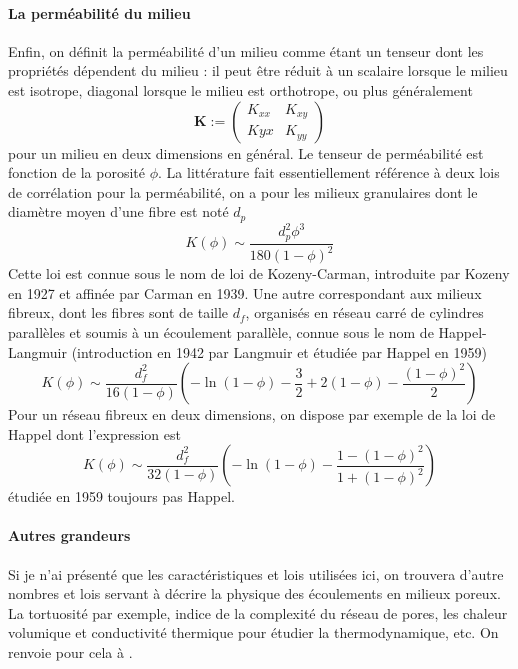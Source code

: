 \paragraph{La perméabilité du milieu} Enfin, on définit la perméabilité d'un milieu comme étant un tenseur dont les propriétés dépendent du milieu : il peut être réduit à un scalaire lorsque le milieu est isotrope, diagonal lorsque le milieu est orthotrope, ou plus généralement $$ \mathbf{K} := \begin{pmatrix} K_{xx} & K_{xy} \\ K{yx} & K_{yy} \end{pmatrix} $$ pour un milieu en deux dimensions en général. Le tenseur de perméabilité est fonction de la porosité $\phi$. La littérature fait essentiellement référence à deux lois de corrélation pour la perméabilité, on a pour les milieux granulaires dont le diamètre moyen d'une fibre est noté $d_p$
\begin{equation*} \tag{KC}
    K(\phi) \sim \frac{d_p^2 \phi^3}{180(1-\phi)^2} 
\end{equation*}
Cette loi est connue sous le nom de loi de Kozeny-Carman, introduite par Kozeny en 1927 et affinée par Carman en 1939. Une autre correspondant aux milieux fibreux, dont les fibres sont de taille $d_f$, organisés en réseau carré de cylindres parallèles et soumis à un écoulement parallèle, connue sous le nom de Happel-Langmuir (introduction en 1942 par Langmuir et étudiée par Happel en 1959)
\begin{equation*} \tag{HL}
    K(\phi) \sim \frac{d_f^2}{16(1-\phi)} \left( -\ln(1-\phi) - \frac{3}{2} + 2(1-\phi) - \frac{(1-\phi)^2}{2} \right)
\end{equation*}
Pour un réseau fibreux en deux dimensions, on dispose par exemple de la loi de Happel dont l'expression est
\begin{equation*} \tag{HL}
    K(\phi) \sim \frac{d_f^2}{32(1-\phi)} \left( -\ln(1-\phi) - \frac{1-(1-\phi)^2}{1+(1-\phi)^2} \right)
\end{equation*}
étudiée en 1959 toujours pas Happel.

\paragraph{Autres grandeurs} Si je n'ai présenté que les caractéristiques et lois utilisées ici, on trouvera d'autre nombres et lois servant à décrire la physique des écoulements en milieux poreux. La tortuosité par exemple, indice de la complexité du réseau de pores, les chaleur volumique et conductivité thermique pour étudier la thermodynamique, etc. On renvoie pour cela à \cite{jpc}.

